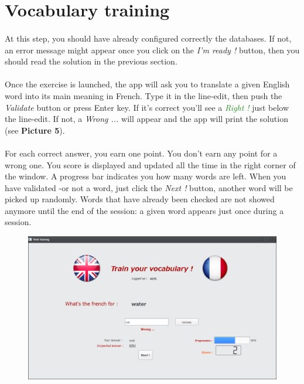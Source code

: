 \documentclass[12pt, a4paper]{report}
\begin{document}
\section*{\hspace{0.6cm}Vocabulary training}

\paragraph{}At this step, you should have already configured correctly the databases. If not, an error message might appear once you click on the \textit{I'm ready !} button, then you should read the solution in the previous section.
\paragraph{}Once the exercise is launched, the app will ask you to translate a given English word into its main meaning in French. Type it in the line-edit, then push the \textit{Validate} button or press Enter key. If it's correct you'll see a \textit{\textcolor{ForestGreen}{Right !}} just below the line-edit. If not, a \textit{\textcolor{BrickRed}{Wrong ...}} will appear and the app will print the solution (see \textbf{Picture 5}).

\paragraph{}For each correct answer, you earn one point. You don't earn any point for a wrong one. You score is displayed and updated all the time in the right corner of the window. A progress bar indicates you how many words are left. When you have validated -or not a word, just click the \textit{Next !} button, another word will be picked up randomly. Words that have already been checked are not showed anymore until the end of the session: a given word appears just once during a session.

\begin{figure}[H]
    \centering
    \includegraphics[scale=0.55]{images/vocab.png}
\end{figure}
\end{document}
